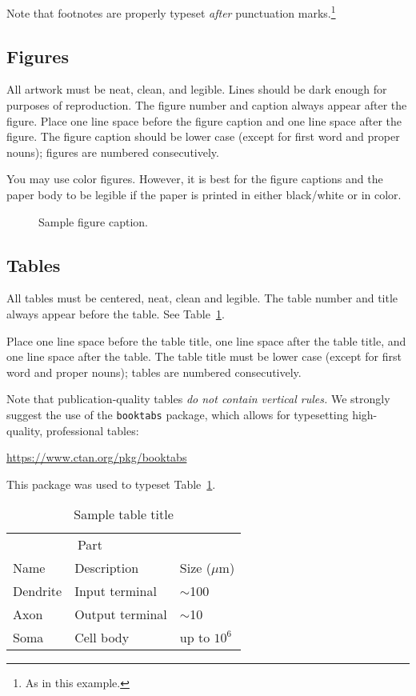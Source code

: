 \documentclass{article}
\begin{document}
	Note that footnotes are properly typeset \emph{after} punctuation
	marks.\footnote{As in this example.}
	
	\subsection{Figures}
	
	All artwork must be neat, clean, and legible. Lines should be dark
	enough for purposes of reproduction. The figure number and caption
	always appear after the figure. Place one line space before the figure
	caption and one line space after the figure. The figure caption should
	be lower case (except for first word and proper nouns); figures are
	numbered consecutively.
	
	You may use color figures.  However, it is best for the figure
	captions and the paper body to be legible if the paper is printed in
	either black/white or in color.
	\begin{figure}[h]
		\centering
		\fbox{\rule[-.5cm]{0cm}{4cm} \rule[-.5cm]{4cm}{0cm}}
		\caption{Sample figure caption.}
	\end{figure}
	
	\subsection{Tables}
	
	All tables must be centered, neat, clean and legible.  The table
	number and title always appear before the table.  See
	Table~\ref{sample-table}.
	
	Place one line space before the table title, one line space after the
	table title, and one line space after the table. The table title must
	be lower case (except for first word and proper nouns); tables are
	numbered consecutively.
	
	Note that publication-quality tables \emph{do not contain vertical
		rules.} We strongly suggest the use of the \verb+booktabs+ package,
	which allows for typesetting high-quality, professional tables:
	\begin{center}
		\url{https://www.ctan.org/pkg/booktabs}
	\end{center}
	This package was used to typeset Table~\ref{sample-table}.
	
	\begin{table}[t]
		\caption{Sample table title}
		\label{sample-table}
		\centering
		\begin{tabular}{lll}
			\toprule
			\multicolumn{2}{c}{Part}                   \\
			\cmidrule{1-2}
			Name     & Description     & Size ($\mu$m) \\
			\midrule
			Dendrite & Input terminal  & $\sim$100     \\
			Axon     & Output terminal & $\sim$10      \\
			Soma     & Cell body       & up to $10^6$  \\
			\bottomrule
		\end{tabular}
	\end{table}
	
\end{document}
